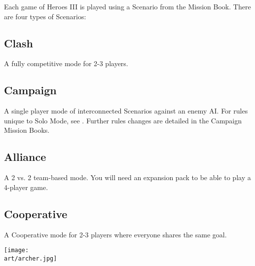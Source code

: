 
\begin{multicols*}{2}

Each game of Heroes III is played using a Scenario from the Mission Book.
There are four types of Scenarios:

\subsection*{Clash}
A fully competitive mode for 2-3 players.

\subsection*{Campaign}
A single player mode of interconnected Scenarios against an enemy AI.
For rules unique to Solo Mode, see .
Further rules changes are detailed in the Campaign Mission Books.

\subsection*{Alliance}
A 2 vs. 2 team-based mode.
You will need an expansion pack to be able to play a 4-player game.

\subsection*{Cooperative}
A Cooperative mode for 2-3 players where everyone shares the same goal.

\vspace*{\fill}

\columnbreak

\texttt{[image: \\art/archer.jpg]}

\end{multicols*}
